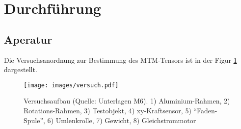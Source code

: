 \section{Durchf\"uhrung}

\subsection{Aperatur}

Die   Versuchsanordnung   zur  Bestimmung  des  MTM-Tensors  ist  in  der  Figur
\ref{fig:versuch} dargestellt.

\begin{figure}[H]
    \center
    \texttt{[image: images/versuch.pdf]}
    \caption{Versuchsaufbau  (Quelle:  Unterlagen  M6).  1)   Aluminium-Rahmen,   2)
    Rotations-Rahmen, 3)  Testobjekt,  4)  xy-Kraftsensor,  5)  ``Faden-Spule'',  6)
    Umlenkrolle, 7) Gewicht, 8) Gleichstrommotor}
    \label{fig:versuch}
\end{figure}


